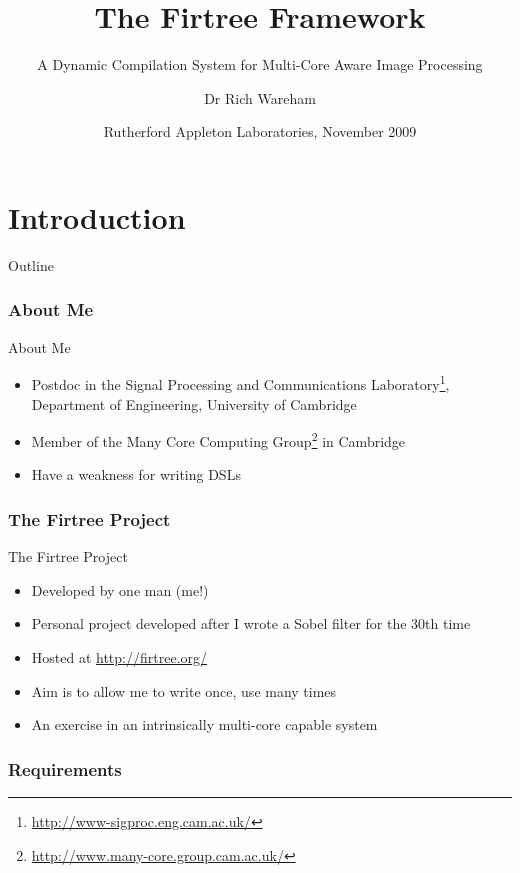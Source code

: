 \documentclass{beamer}
\title{The Firtree Framework}
\subtitle{A Dynamic Compilation System for Multi-Core Aware Image Processing}
\author{Dr Rich Wareham}
\institute
{
  Department of Engineering\\
  University of Cambridge
}
\date{Rutherford Appleton Laboratories, November 2009}
\newcommand{\fancypart}[1]{%
  \part{#1}
  \begin{frame}
    \partpage
  \end{frame}
  \begin{frame}{Outline}
    \tableofcontents
  \end{frame}
}
\newcommand{\bi}{\begin{itemize}}
\newcommand{\ei}{\end{itemize}}
\begin{document}
\begin{frame}
  \titlepage
\end{frame}

\fancypart{Introduction} %

\section{About Me}  %

\begin{frame}{About Me}
  \bi
  
  \item Postdoc in the Signal Processing and Communications
  Laboratory\footnote{\url{http://www-sigproc.eng.cam.ac.uk/}}, Department of
  Engineering, University of Cambridge

  \item Member of the Many Core Computing
  Group\footnote{\url{http://www.many-core.group.cam.ac.uk/}} in Cambridge

  \item Have a weakness for writing DSLs

  \ei
\end{frame}


\section{The Firtree Project} %

\begin{frame}{The Firtree Project}
  \bi
    \item Developed by one man (me!)
    
    \item Personal project developed after I wrote a Sobel filter for the 30th
    time

    \item Hosted at \url{http://firtree.org/}

    \item Aim is to allow me to write once, use many times

    \item An exercise in an intrinsically multi-core capable system
  \ei
\end{frame}


\section{Requirements} %
\end{document}
